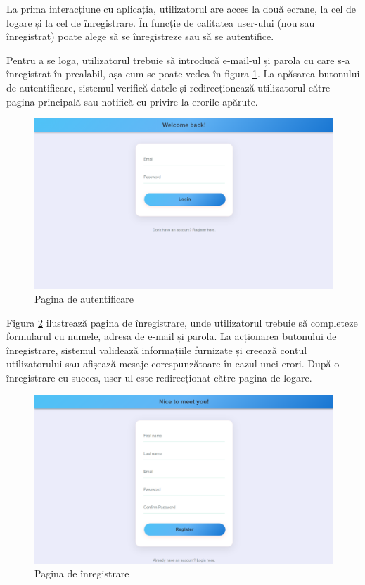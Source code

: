 La prima interacțiune cu aplicația, utilizatorul are acces la două ecrane, la cel de logare și la cel de înregistrare. 
În funcție de calitatea user-ului (nou sau înregistrat) poate alege să se înregistreze sau să se autentifice.
\par
Pentru a se loga, utilizatorul trebuie să introducă e-mail-ul și parola cu care s-a înregistrat în prealabil, așa cum se poate vedea în figura \ref{FigLoginPage}. 
La apăsarea butonului de autentificare, sistemul verifică datele și redirecționează utilizatorul către pagina principală sau notifică cu privire la erorile apărute. 

\begin{figure}[htbp]
	\centering
    \includegraphics[scale=0.35]{./figures/login-page.png}
	\caption{Pagina de autentificare}
	\label{FigLoginPage}
\end{figure}

\par
Figura \ref{FigRegisterPage} ilustrează pagina de înregistrare, unde utilizatorul trebuie să completeze formularul cu numele, adresa de e-mail și parola.
La acționarea butonului de înregistrare, sistemul validează informațiile furnizate și creează contul utilizatorului sau afișează mesaje corespunzătoare în cazul unei erori.
După o înregistrare cu succes, user-ul este redirecționat către pagina de logare.

\begin{figure}[htbp]
	\centering
    \includegraphics[scale=0.35]{./figures/register-page.png}
	\caption{Pagina de înregistrare}
	\label{FigRegisterPage}
\end{figure}

